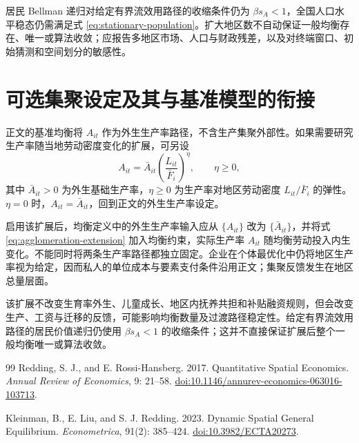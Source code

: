\documentclass[UTF8,a4paper,zihao=-4,fontset=windows]{ctexart}
\numberwithin{equation}{section}
\begin{document}
居民 Bellman 递归对给定有界流效用路径的收缩条件仍为 $\beta s_A<1$，全国人口水平稳态仍需满足式 \eqref{eq:stationary-population}。扩大地区数不自动保证一般均衡存在、唯一或算法收敛；应报告多地区市场、人口与财政残差，以及对终端窗口、初始猜测和空间划分的敏感性。

\section{可选集聚设定及其与基准模型的衔接}
\label{app:agglomeration}
正文的基准均衡将 $A_{it}$ 作为外生生产率路径，不含生产集聚外部性。如果需要研究生产率随当地劳动密度变化的扩展，可另设
\begin{equation}
  A_{it}=\bar A_{it}\left(\frac{L_{it}}{\bar F_i}\right)^{\eta},
  \qquad \eta\geq0,
  \label{eq:agglomeration-extension}
\end{equation}
其中 $\bar A_{it}>0$ 为外生基础生产率，$\eta\geq0$ 为生产率对地区劳动密度 $L_{it}/\bar F_i$ 的弹性。$\eta=0$ 时，$A_{it}=\bar A_{it}$，回到正文的外生生产率设定。

启用该扩展后，均衡定义中的外生生产率输入应从 $\{A_{it}\}$ 改为 $\{\bar A_{it}\}$，并将式 \eqref{eq:agglomeration-extension} 加入均衡约束，实际生产率 $A_{it}$ 随均衡劳动投入内生变化。不能同时将两条生产率路径都独立固定。企业在个体最优化中仍将地区生产率视为给定，因而私人的单位成本与要素支付条件沿用正文；集聚反馈发生在地区总量层面。

该扩展不改变生育率外生、儿童成长、地区内抚养共担和补贴融资规则，但会改变生产、工资与迁移的反馈，可能影响均衡数量及过渡路径稳定性。给定有界流效用路径的居民价值递归仍使用 $\beta s_A<1$ 的收缩条件；这并不直接保证扩展后整个一般均衡唯一或算法收敛。

\clearpage
\begin{thebibliography}{99}
Redding, S. J., and E. Rossi-Hansberg. 2017.
Quantitative Spatial Economics.
\emph{Annual Review of Economics}, 9: 21--58.
\href{https://doi.org/10.1146/annurev-economics-063016-103713}{doi:10.1146/annurev-economics-063016-103713}.

Kleinman, B., E. Liu, and S. J. Redding. 2023.
Dynamic Spatial General Equilibrium.
\emph{Econometrica}, 91(2): 385--424.
\href{https://doi.org/10.3982/ECTA20273}{doi:10.3982/ECTA20273}.
\end{thebibliography}
\end{document}
